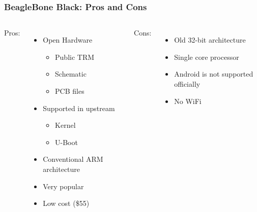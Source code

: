 \documentclass[aspectratio=169]{beamer}
\begin{document}
\begin{frame}
  \frametitle{BeagleBone Black: Pros and Cons}
  \begin{columns}[t]
    Pros:
    \begin{itemize}
    \item Open Hardware
      \begin{itemize}
      \item Public TRM
      \item Schematic
      \item PCB files
      \end{itemize}
    \item Supported in upstream
      \begin{itemize}
      \item Kernel
      \item U-Boot
      \end{itemize}
    \item Conventional ARM architecture
    \item Very popular
    \item Low cost (\$55)
    \end{itemize}

    Cons:
    \begin{itemize}
    \item Old 32-bit architecture
    \item Single core processor
    \item Android is not supported officially
    \item No WiFi
    \end{itemize}
  \end{columns}
\end{frame}
\end{document}

